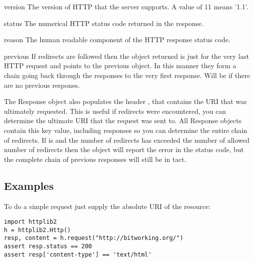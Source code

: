 \begin{memberdesc}[Response]{version}
The version of HTTP that the server supports. A value
of 11 means '1.1'.
\end{memberdesc}

\begin{memberdesc}[Response]{status}
The numerical HTTP status code returned in the response.
\end{memberdesc}

\begin{memberdesc}[Response]{reason}
The human readable component of the HTTP response status code.
\end{memberdesc}

\begin{memberdesc}[Response]{previous}
If redirects are followed then the  object returned
is just for the very last HTTP request and  points to
the previous  object. In this manner they form a chain
going back through the responses to the very first response.
Will be  if there are no previous respones.
\end{memberdesc}

The Response object also populates the header , that
contains the URI that was ultimately requested. This is useful if
redirects were encountered, you can determine the ultimate URI that
the request was sent to. All Response objects contain this key value,
including  responses so you can determine the entire
chain of redirects. If  is 
and the number of redirects has exceeded the number of allowed number 
of redirects then the  object will report the error
in the status code, but the complete chain of previous responses will
still be in tact.



\subsection{Examples \label{httplib2-example}}

To do a simple  request just supply the absolute URI
of the resource:

\begin{verbatim}
import httplib2
h = httplib2.Http()
resp, content = h.request("http://bitworking.org/")
assert resp.status == 200
assert resp['content-type'] == 'text/html'
\end{verbatim}

